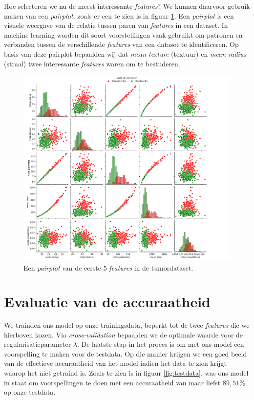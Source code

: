 \documentclass[twoside, kulak]{kulakreport}
\begin{document}
	Hoe selecteren we nu de meest interessante \textit{features}? We kunnen daarvoor gebruik maken van een \textit{pairplot}, zoals er een te zien is in figuur \ref{fig:pairplot}. Een \textit{pairplot} is een visuele weergave van de relatie tussen paren van \textit{features} in een dataset. In machine learning worden dit soort voorstellingen vaak gebruikt om patronen en verbanden tussen de verschillende \textit{features} van een dataset te identificeren. Op basis van deze pairplot bepaalden wij dat \textit{mean texture} (textuur) en \textit{mean radius} (straal) twee interessante \textit{features} waren om te bestuderen.
	
	\begin{figure}
		\centering
		\includegraphics[width=1\textwidth]{pairplot}
		\caption{Een \textit{pairplot} van de eerste 5 \textit{features} in de tumordataset.}
		\label{fig:pairplot}
	\end{figure}
	
	\section{Evaluatie van de accuraatheid}
	
	We trainden ons model op onze trainingsdata, beperkt tot de twee \textit{features} die we hierboven kozen. Via \textit{cross-validation} bepaalden we de optimale waarde voor de regularisatieparameter \(\lambda\). De laatste stap in het proces is om met ons model een voorspelling te maken voor de testdata. Op die manier krijgen we een goed beeld van de effectieve accuraatheid van het model indien het data te zien krijgt waarop het niet getraind is. Zoals te zien is in figuur \ref{fig:testdata}, was ons model in staat om voorspellingen te doen met een accuraatheid van maar liefst \(89,51\%\) op onze testdata.
	
\end{document}
